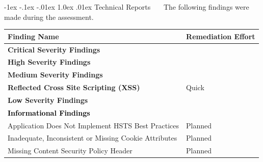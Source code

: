 \documentclass{article}
\makeatletter
\renewcommand{\section}{\@startsection{section}{1}{\z@}%
            {-1ex \@plus -.1ex \@minus -.01ex}%
            {1.0ex \@plus  .01ex}%
            {\normalfont\large\bfseries\color{sectioncolor}}}
\makeatother
\begin{document}
            \section{\large Technical Reports}
            \ \ \ The following findings were made during the assessment.    
            \begin{center}
                \begin{longtable}{|p{30em}|p{10em}|}
            \hline
            \textbf{Finding Name} & \textbf{Remediation Effort}  \\
            \hline
            \normalsize \textcolor{critical}{\textbf{Critical Severity Findings}} & \\
            \hline
            \multicolumn{2}{|p{20em}|}{\normalsize \textcolor{high}{\textbf{High Severity Findings}}} \\
            \hline
            \multicolumn{2}{|p{20em}|}{\normalsize \textcolor{medium}{\textbf{Medium Severity Findings}}} \\
            \hline
            \normalsize \textbf{Reflected Cross Site Scripting (XSS) } & {Quick}\\
            \hline
            \multicolumn{2}{|p{20em}|}{\normalsize \textcolor{low}{\textbf{Low Severity Findings}}} \\
            \hline
            \multicolumn{2}{|p{20em}|}{\normalsize \textcolor{infotext}{\textbf{Informational Findings}}} \\
            \hline
            
                    Application Does Not Implement HSTS Best Practices & Planned \\
                    \hline
                    Inadequate, Inconsistent or Missing Cookie Attributes & Planned \\
                    \hline
                    Missing Content Security Policy Header & Planned \\
                    \hline\end{longtable}
            \end{center}  
            
                \newpage
\end{document}
